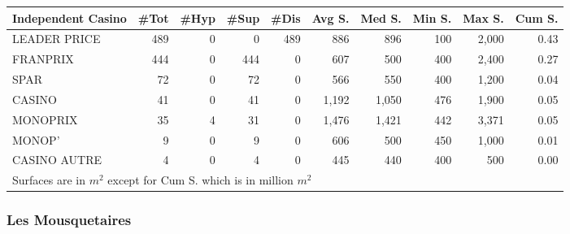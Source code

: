 \documentclass[11pt]{article}
\begin{document}
\begin{table}[H]
\footnotesize
\setlength{\tabcolsep}{2pt}

\begin{tabular}{lrrrrrrrrr}
\toprule
\toprule
Independent Casino &       \#Tot &       \#Hyp &       \#Sup &       \#Dis &     Avg S. &     Med S. &     Min S. &     Max S. &     Cum S. \\
\midrule
LEADER PRICE &        489 &          0 &          0 &        489 &        886 &        896 &        100 &      2,000 &       0.43 \\
FRANPRIX     &        444 &          0 &        444 &          0 &        607 &        500 &        400 &      2,400 &       0.27 \\
SPAR         &         72 &          0 &         72 &          0 &        566 &        550 &        400 &      1,200 &       0.04 \\
CASINO       &         41 &          0 &         41 &          0 &      1,192 &      1,050 &        476 &      1,900 &       0.05 \\
MONOPRIX     &         35 &          4 &         31 &          0 &      1,476 &      1,421 &        442 &      3,371 &       0.05 \\
MONOP'       &          9 &          0 &          9 &          0 &        606 &        500 &        450 &      1,000 &       0.01 \\
CASINO AUTRE &          4 &          0 &          4 &          0 &        445 &        440 &        400 &        500 &       0.00 \\
\bottomrule
\multicolumn{10}{l}{\footnotesize Surfaces are in $m^2$ except for Cum S. which is in million $m^2$} \\
\end{tabular}

\end{table}

\subsubsection{Les Mousquetaires}
\end{document}
